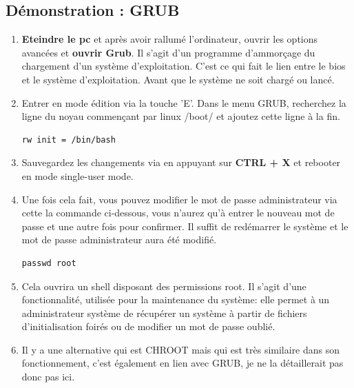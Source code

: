 \documentclass[12pt,a4paper]{article}
\begin{document}
        \subsection{Démonstration : GRUB}
        \begin{enumerate}
        	\item \textbf{Eteindre le pc} et après avoir rallumé l'ordinateur, ouvrir les options avancées et \textbf{ouvrir Grub}. Il s'agit d'un programme d'ammorçage du chargement d'un système d'exploitation. C'est ce qui fait le lien entre le bios et le système d'exploitation. Avant que le système ne soit chargé ou lancé.
        	\item Entrer en mode édition via la touche 'E'. Dans le menu GRUB, recherchez la ligne du noyau commençant par linux /boot/ et ajoutez cette ligne à la fin.
        	\begin{lstlisting}
rw init = /bin/bash
        	\end{lstlisting}
        	\item Sauvegardez les changements via en appuyant sur \textbf{CTRL + X} et rebooter en mode single-user mode.
        	\item Une fois cela fait, vous pouvez modifier le mot de passe administrateur via cette la commande ci-dessous, vous n'aurez qu'à entrer le nouveau mot de passe et une autre fois pour confirmer. Il suffit de redémarrer le système et le mot de passe administrateur aura été modifié. \cite{grubchangepassword:online}
        	\begin{lstlisting}
passwd root
        	\end{lstlisting}
         \item Cela ouvrira un shell disposant des permissions root. Il s’agit d’une fonctionnalité, utilisée pour la maintenance du système: elle permet à un administrateur système de récupérer un système à partir de fichiers d’initialisation foirés ou de modifier un mot de passe oublié.
        
        \item Il y a une alternative qui est CHROOT mais qui est très similaire dans son fonctionnement, c'est également en lien avec GRUB, je ne la détaillerait pas donc pas ici.
        \end{enumerate}
\end{document}
